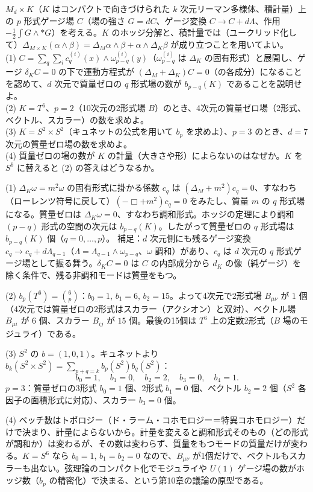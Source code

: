 \begin{problem}[難易度 D]\label{ch05-prob-kkgen}
$M_d\times K$（$K$ はコンパクトで向きづけられた $k$ 次元リーマン多様体、積計量）上の $p$ 形式ゲージ場 $C$（場の強さ $G=dC$、ゲージ変換 $C\to C+d\Lambda$、作用 $-\frac12\int G\wedge{*G}$）を考える。$K$ のホッジ分解と、積計量では（ユークリッド化して）$\Delta_{M\times K}(\alpha\wedge\beta)=\Delta_M\alpha\wedge\beta+\alpha\wedge\Delta_K\beta$ が成り立つことを用いてよい。\\
(1) $C=\sum_q\sum_ic^{(i)}_q(x)\wedge\omega^{(i)}_{p-q}(y)$（$\omega^{(i)}_{p-q}$ は $\Delta_K$ の固有形式）と展開し、ゲージ $\delta_KC=0$ の下で運動方程式が $(\Delta_M+\Delta_K)C=0$（の各成分）になることを認めて、$d$ 次元で質量ゼロの $q$ 形式場の数が $b_{p-q}(K)$ であることを説明せよ。\\
(2) $K=T^6$、$p=2$（10次元の2形式場 $B$）のとき、4次元の質量ゼロ場（2形式、ベクトル、スカラー）の数を求めよ。\\
(3) $K=S^2\times S^2$（キュネットの公式を用いて $b_p$ を求めよ）、$p=3$ のとき、$d=7$ 次元の質量ゼロ場の数を求めよ。\\
(4) 質量ゼロの場の数が $K$ の計量（大きさや形）によらないのはなぜか。$K$ を $S^6$ に替えると (2) の答えはどうなるか。
\end{problem}

\begin{solution}
(1) $\Delta_K\omega=m^2\omega$ の固有形式に掛かる係数 $c_q$ は $(\Delta_M+m^2)c_q=0$、すなわち（ローレンツ符号に戻して）$(-\Box+m^2)c_q=0$ をみたし、質量 $m$ の $q$ 形式場になる。質量ゼロは $\Delta_K\omega=0$、すなわち調和形式。ホッジの定理により調和 $(p-q)$ 形式の空間の次元は $b_{p-q}(K)$。したがって質量ゼロの $q$ 形式場は $b_{p-q}(K)$ 個（$q=0,\dots,p$）。
補足：$d$ 次元側にも残るゲージ変換 $c_q\to c_q+d\Lambda_{q-1}$（$\Lambda=\Lambda_{q-1}\wedge\omega_{p-q}$、$\omega$ 調和）があり、$c_q$ は $d$ 次元の $q$ 形式ゲージ場として振る舞う。$\delta_K C=0$ は $C$ の内部成分から $d_K$ の像（純ゲージ）を除く条件で、残る非調和モードは質量をもつ。

(2) $b_p(T^6)=\binom6p$：$b_0=1$, $b_1=6$, $b_2=15$。よって4次元で2形式場 $B_{\mu\nu}$ が $1$ 個（4次元では質量ゼロの2形式はスカラー（アクシオン）と双対）、ベクトル場 $B_{\mu i}$ が $6$ 個、スカラー $B_{ij}$ が $15$ 個。最後の15個は $T^6$ 上の定数2形式（$B$ 場のモジュライ）である。

(3) $S^2$ の $b=(1,0,1)$。キュネットより $b_k(S^2\times S^2)=\sum_{p+q=k}b_p(S^2)b_q(S^2)$：
\[
b_0=1,\quad b_1=0,\quad b_2=2,\quad b_3=0,\quad b_4=1 .
\]
$p=3$：質量ゼロの3形式 $b_0=1$ 個、2形式 $b_1=0$ 個、ベクトル $b_2=2$ 個（$S^2$ 各因子の面積形式に対応）、スカラー $b_3=0$ 個。

(4) ベッチ数はトポロジー（ド・ラーム・コホモロジー＝特異コホモロジー）だけで決まり、計量によらないから。計量を変えると調和形式そのもの（どの形式が調和か）は変わるが、その数は変わらず、質量をもつモードの質量だけが変わる。$K=S^6$ なら $b_0=1$, $b_1=b_2=0$ なので、$B_{\mu\nu}$ が1個だけで、ベクトルもスカラーも出ない。弦理論のコンパクト化でモジュライや $U(1)$ ゲージ場の数がホッジ数（$b_p$ の精密化）で決まる、という第10章の議論の原型である。
\end{solution}
